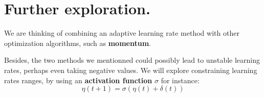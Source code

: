 \documentclass[]{article}
\begin{document}
\section{Further exploration.}
We are thinking of combining an adaptive learning rate method with other optimization algorithms, such as \textbf{momentum}. 

Besides, the two methods we mentionned could possibly lead to unstable learning rates, perhaps even taking negative values. We will explore constraining learning rates ranges, by using an \textbf{activation function} $\sigma$ for instance:\\
\begin{equation}
\eta(t+1) = \sigma(\eta(t)+\delta(t))
\end{equation}
\end{document}
